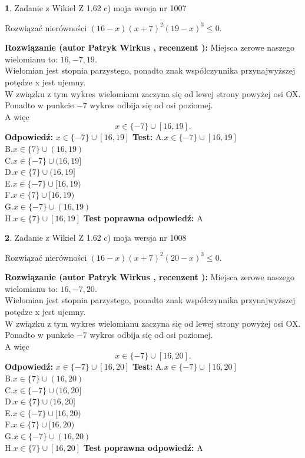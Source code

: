 \documentclass[12pt, a4paper]{article}
\theoremstyle{definition} %
\newtheorem{zad}{}
\newcommand{\zadStart}[1]{\begin{zad}#1\newline}
\newcommand{\zadStop}{\end{zad}}
\newcommand{\rozwStart}[2]{\noindent \textbf{Rozwiązanie (autor #1 , recenzent #2): }\newline}
\newcommand{\rozwStop}{\newline}
\newcommand{\odpStart}{\noindent \textbf{Odpowiedź:}\newline}
\newcommand{\odpStop}{\newline}
\newcommand{\testStart}{\noindent \textbf{Test:}\newline}
\newcommand{\testStop}{\newline}
\newcommand{\kluczStart}{\noindent \textbf{Test poprawna odpowiedź:}\newline}
\newcommand{\kluczStop}{\newline}
\begin{document}
\zadStart{Zadanie z Wikieł Z 1.62 c) moja wersja nr 1007}

Rozwiązać nierówności $(16-x)(x+7)^{2}(19-x)^{3}\le0$.
\zadStop
\rozwStart{Patryk Wirkus}{}
Miejsca zerowe naszego wielomianu to: $16, -7, 19$.\\
Wielomian jest stopnia parzystego, ponadto znak współczynnika przy\linebreak najwyższej potędze x jest ujemny.\\ W związku z tym wykres wielomianu zaczyna się od lewej strony powyżej osi OX.\\
Ponadto w punkcie $-7$ wykres odbija się od osi poziomej.\\
A więc $$x \in \{-7\} \cup [16,19].$$
\rozwStop
\odpStart
$x \in \{-7\} \cup [16,19]$
\odpStop
\testStart
A.$x \in \{-7\} \cup [16,19]$\\
B.$x \in \{7\} \cup (16,19)$\\
C.$x \in \{-7\} \cup (16,19]$\\
D.$x \in \{7\} \cup (16,19]$\\
E.$x \in \{-7\} \cup [16,19)$\\
F.$x \in \{7\} \cup [16,19)$\\
G.$x \in \{-7\} \cup (16,19)$\\
H.$x \in \{7\} \cup [16,19]$
\testStop
\kluczStart
A
\kluczStop



\zadStart{Zadanie z Wikieł Z 1.62 c) moja wersja nr 1008}

Rozwiązać nierówności $(16-x)(x+7)^{2}(20-x)^{3}\le0$.
\zadStop
\rozwStart{Patryk Wirkus}{}
Miejsca zerowe naszego wielomianu to: $16, -7, 20$.\\
Wielomian jest stopnia parzystego, ponadto znak współczynnika przy\linebreak najwyższej potędze x jest ujemny.\\ W związku z tym wykres wielomianu zaczyna się od lewej strony powyżej osi OX.\\
Ponadto w punkcie $-7$ wykres odbija się od osi poziomej.\\
A więc $$x \in \{-7\} \cup [16,20].$$
\rozwStop
\odpStart
$x \in \{-7\} \cup [16,20]$
\odpStop
\testStart
A.$x \in \{-7\} \cup [16,20]$\\
B.$x \in \{7\} \cup (16,20)$\\
C.$x \in \{-7\} \cup (16,20]$\\
D.$x \in \{7\} \cup (16,20]$\\
E.$x \in \{-7\} \cup [16,20)$\\
F.$x \in \{7\} \cup [16,20)$\\
G.$x \in \{-7\} \cup (16,20)$\\
H.$x \in \{7\} \cup [16,20]$
\testStop
\kluczStart
A
\kluczStop
\end{document}
